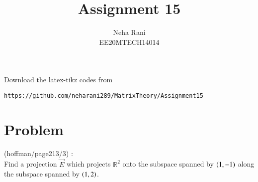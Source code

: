 \documentclass[journal,12pt]{IEEEtran}
\begin{document}
     \def\rightbox#1{\makebox[0in][r]{#1}}
     \def\centbox#1{\makebox[0in]{#1}}
     \def\topbox#1{\raisebox{-\baselineskip}[0in][0in]{#1}}
     \def\midbox#1{\raisebox{-0.5\baselineskip}[0in][0in]{#1}}
\vspace{3cm}
\title{Assignment 15}
\author{Neha Rani\\EE20MTECH14014}
\maketitle
\bigskip
\renewcommand{\thefigure}{\theenumi}
\renewcommand{\thetable}{\theenumi}
%
Download the latex-tikz codes from 
%
\begin{lstlisting}
https://github.com/neharani289/MatrixTheory/Assignment15
\end{lstlisting}
\section{\textbf{Problem}}
%
(hoffman/page213/3) : 
\bigskip\\
%
Find a projection $\vec{E}$ which projects $\mathbb{R}^{2}$ onto the subspace spanned by $\left(1,-1\right)$ along the subspace spanned by $\left(1,2\right)$.
\bigskip
\end{document}
